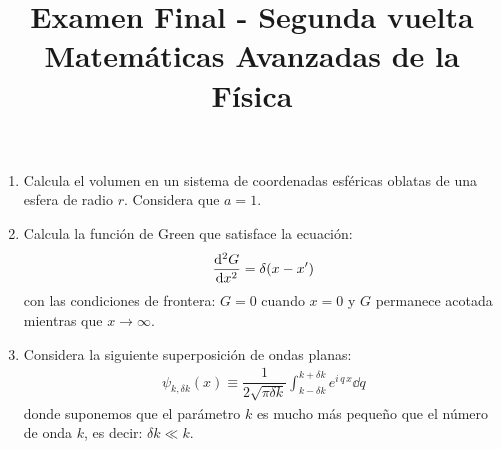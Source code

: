 
\author{}
\title{Examen Final - Segunda vuelta\\ \large{Matemáticas Avanzadas de la Física} \vspace{-50pt}}
\date{}

\renewcommand\labelenumii{\theenumi.{\arabic{enumii})}}
\maketitle
\fontsize{14}{14}\selectfont
\begin{enumerate}
\item Calcula el volumen en un sistema de coordenadas esféricas oblatas de una esfera de radio $r$. Considera que $a = 1$.
\item Calcula la función de Green que satisface la ecuación:
\begin{align*}
\dv[2]{G}{x} = \delta(x - x^{\prime})
\end{align*}
con las condiciones de frontera: $G = 0$ cuando $x = 0$ y $G$ permanece acotada mientras que $x \to \infty$.
\item Considera la siguiente superposición de ondas planas:
\begin{align*}
\psi_{k, \delta k} (x) \equiv \dfrac{1}{2 \sqrt{\pi \delta k}} \int_{k -\delta k}^{k + \delta k} e^{i \, q \, x} \dd{q}
\end{align*}
donde suponemos que el parámetro $k$ es mucho más pequeño que el número de onda $k$, es decir: $\delta k \ll k$.


\end{enumerate}
